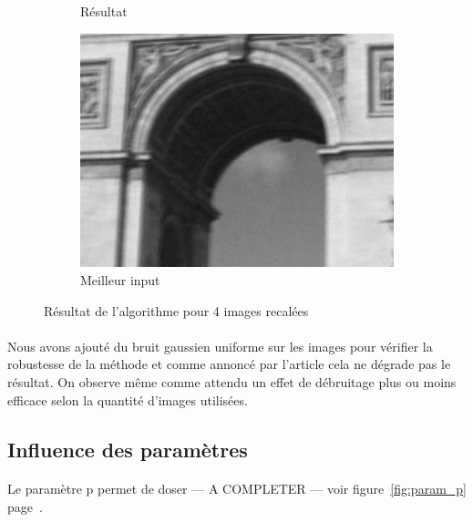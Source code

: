 \documentclass[a4paper,10pt]{report}
\begin{document}
\begin{figure}[h]
\begin{subfigure}{0.32\textwidth}
\caption{Résultat}
\label{fig:Resultat}
\end{subfigure}
\begin{subfigure}{0.32\textwidth}
\includegraphics[width=0.9\linewidth]{ressource/detail_flou1.png} 
\caption{Meilleur input}
\label{fig:Bestflou}
\end{subfigure}

\caption{Résultat de l'algorithme pour 4 images recalées}
\label{fig:arctriomphe}
\end{figure}

\paragraph{}
Nous avons ajouté du bruit gaussien uniforme sur les images pour vérifier la robustesse de la méthode
et comme annoncé par l'article cela ne dégrade pas le résultat. On observe même comme attendu un effet
de débruitage plus ou moins efficace selon la quantité d'images utilisées.

\subsection{Influence des paramètres}
\paragraph{}
Le paramètre p permet de doser --- A COMPLETER --- voir figure~\ref{fig:param_p} page~\pageref{fig:param_p}.
\end{document}
